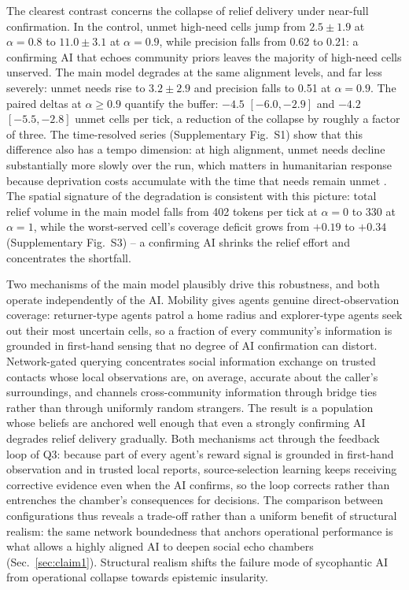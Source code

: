 \documentclass[pdflatex,sn-basic]{sn-jnl}
\begin{document}
The clearest contrast concerns the collapse of relief delivery under near-full confirmation. In the control, unmet high-need cells jump from $2.5 \pm 1.9$ at $\alpha = 0.8$ to $11.0 \pm 3.1$ at $\alpha = 0.9$, while precision falls from 0.62 to 0.21: a confirming AI that echoes community priors leaves the majority of high-need cells unserved. The main model degrades at the same alignment levels, and far less severely: unmet needs rise to $3.2 \pm 2.9$ and precision falls to 0.51 at $\alpha = 0.9$. The paired deltas at $\alpha \geq 0.9$ quantify the buffer: $-4.5$ $[-6.0, -2.9]$ and $-4.2$ $[-5.5, -2.8]$ unmet cells per tick, a reduction of the collapse by roughly a factor of three. The time-resolved series (Supplementary Fig.~S1) show that this difference also has a tempo dimension: at high alignment, unmet needs decline substantially more slowly over the run, which matters in humanitarian response because deprivation costs accumulate with the time that needs remain unmet \citep{holguin2012unique}. The spatial signature of the degradation is consistent with this picture: total relief volume in the main model falls from 402 tokens per tick at $\alpha = 0$ to 330 at $\alpha = 1$, while the worst-served cell's coverage deficit grows from $+0.19$ to $+0.34$ (Supplementary Fig.~S3) -- a confirming AI shrinks the relief effort and concentrates the shortfall.

Two mechanisms of the main model plausibly drive this robustness, and both operate independently of the AI. Mobility gives agents genuine direct-observation coverage: returner-type agents patrol a home radius and explorer-type agents seek out their most uncertain cells, so a fraction of every community's information is grounded in first-hand sensing that no degree of AI confirmation can distort. Network-gated querying concentrates social information exchange on trusted contacts whose local observations are, on average, accurate about the caller's surroundings, and channels cross-community information through bridge ties rather than through uniformly random strangers. The result is a population whose beliefs are anchored well enough that even a strongly confirming AI degrades relief delivery gradually. Both mechanisms act through the feedback loop of Q3: because part of every agent's reward signal is grounded in first-hand observation and in trusted local reports, source-selection learning keeps receiving corrective evidence even when the AI confirms, so the loop corrects rather than entrenches the chamber's consequences for decisions. The comparison between configurations thus reveals a trade-off rather than a uniform benefit of structural realism: the same network boundedness that anchors operational performance is what allows a highly aligned AI to deepen social echo chambers (Sec.~\ref{sec:claim1}). Structural realism shifts the failure mode of sycophantic AI from operational collapse towards epistemic insularity.
\end{document}
